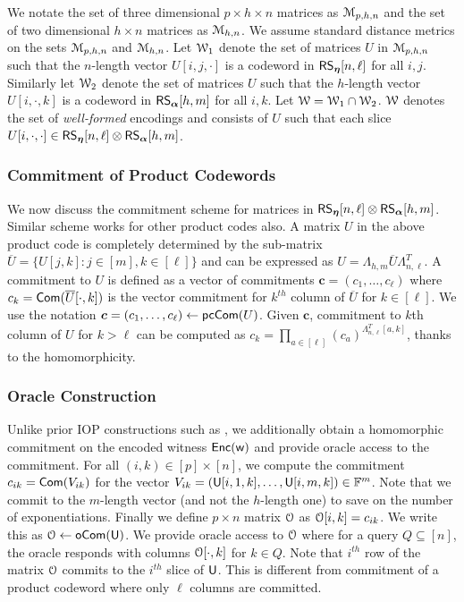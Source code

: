 We notate the set of three dimensional $p\times h\times n$ matrices as $\mathcal{M}_{p,h,n}$ and the set of two dimensional $h\times n$ matrices as $\mathcal{M}_{h, n}$. We assume standard distance metrics on the sets $\mathcal{M}_{p,h,n}$ and $\mathcal{M}_{h,n}$. Let $\mathcal{W}_1$ denote the set of matrices $U$ in $\mathcal{M}_{p,h,n}$ such that the $n$-length vector $U[i,j,\cdot]$ is a
codeword in $\mathsf{RS}_{\bm{\eta}}[n,\ell]$ for all $i,j$. Similarly let $\mathcal{W}_2$ denote the set of matrices $U$ such that the $h$-length vector $U[i,\cdot,k]$ is a codeword in
$\mathsf{RS}_{\bm{\alpha}}[h,m]$ for all $i,k$.  Let $\mathcal{W}=\mathcal{W}_1\cap \mathcal{W}_2$. $\mathcal{W}$ denotes the set of {\em well-formed} encodings  and consists of $U$ such that each slice $U[i,\cdot,\cdot]\in \mathsf{RS}_{\bm{\eta}}[n,\ell]\otimes \mathsf{RS}_{\bm{\alpha}}[h,m]$. 

\subsubsection{Commitment of Product Codewords}\label{subsec:matrixcommitment}
We now discuss the commitment scheme for matrices in $\mathsf{RS}_{\bm{\eta}}[n,\ell] \otimes \mathsf{RS}_{\bm{\alpha}}[h,m]$. Similar scheme works for other product codes also. A matrix $U$ in the above product code is completely determined by the sub-matrix $\overline{U}=\{U[j,k]: j\in [m], k\in [\ell]\}$ and can be expressed as $U=\Lambda_{h,m}\overline{U}\Lambda_{n,\ell}^T$. 
A commitment to $U$ is defined as  a vector of commitments $\bm{c}=(c_1,\ldots,c_\ell)$ where $c_k=\mathsf{Com}(\overline{U}[\cdot,k])$ is the vector commitment for $k^{th}$ column of $\overline{U}$ for $k\in [\ell]$. We use the notation $\bm{c} = (c_1,\ldots,c_\ell) \leftarrow \mathsf{pcCom}(U)$. Given $\bm{c}$, commitment to $k$th column of $U$ for $k > \ell$ 
can be computed as  $c_k=\prod_{a\in [\ell]}(c_a)^{\Lambda_{n,\ell}^T[a,k]}$, thanks to the homomorphicity. 

\subsubsection{Oracle Construction}\label{subsec:construct_oracle}
Unlike prior IOP constructions such as \cite{ligero, aurora}, we additionally obtain a homomorphic commitment on the encoded witness $\mathsf{Enc}(\mathsf{w})$ and provide oracle access to the commitment. For all $(i,k)\in [p]\times [n]$, we compute the commitment $c_{ik}=\mathsf{Com}(V_{ik})$ for the vector $V_{ik}=(\mathsf{U}[i,1,k],\ldots,\mathsf{U}[i,m,k])\in \mathbb{F}^m$. Note that we commit to the $m$-length vector (and not the $h$-length one)  to save on the number of exponentiations. 
Finally we define $p\times n$ matrix $\mathcal{O}$ as $\mathcal{O}[i,k]=c_{ik}$. We write this as $\mathcal{O} \leftarrow \mathsf{oCom}(\mathsf{U})$. We provide oracle access to $\mathcal{O}$ where for a
query $Q\subseteq [n]$, the oracle responds with columns $\mathcal{O}[\cdot,k]$ for $k\in Q$. Note that $i^{th}$ row of the matrix $\mathcal{O}$ commits to the $i^{th}$ slice of $\mathsf{U}$. This is different from  commitment of a product codeword where only $\ell$ columns are committed.

